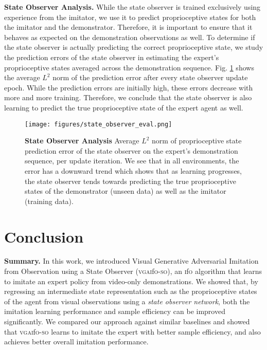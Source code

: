 \documentclass[letterpaper, 10 pt, conference]{ieeeconf}  %
\newcommand{\ifo}{\textsc{i}f\textsc{o}}
\newcommand{\vgaifoso}{\textsc{vgai}f\textsc{o}-\textsc{so}}
\begin{document}
\textbf{State Observer Analysis.} While the state observer is trained exclusively using experience from the imitator, we use it to predict proprioceptive states for both the imitator and the demonstrator. Therefore, it is important to ensure that it behaves as expected on the demonstration observations as well. To determine if the state observer is actually predicting the correct proprioceptive state, we study the prediction errors of the state observer in estimating the expert's proprioceptive states averaged across the demonstration sequence. Fig. \ref{fig:so_learning_curve} shows the average $L^2$ norm of the prediction error after every state observer update epoch. While the prediction errors are initially high, these errors decrease with more and more training. Therefore, we conclude that the state observer is also learning to predict the true proprioceptive state of the expert agent as well.

\begin{figure}
	\centering
	\texttt{[image: figures/state\_observer\_eval.png]}
	\caption{\textbf{State Observer Analysis} Average $L^2$ norm of proprioceptive state prediction error of the state observer on the expert's demonstration sequence, per update iteration. We see that in all environments, the error has a downward trend which shows that as learning progresses, the state observer tends towards predicting the true proprioceptive states of the demonstrator (unseen data) as well as the imitator (training data). }
	\label{fig:so_learning_curve}
\end{figure}


\section{Conclusion}
\label{sec:conclusion}
\textbf{Summary.} 
In this work, we introduced Visual Generative Adversarial Imitation from Observation using a State Observer (\vgaifoso{}), an \ifo{} algorithm that learns to imitate an expert policy from video-only demonstrations. We showed that, by regressing an intermediate state representation such as the proprioceptive states of the agent from visual observations using a \textit{state observer network}, both the imitation learning performance and sample efficiency can be improved significantly. We compared our approach against similar baselines and showed that \vgaifoso{} learns to imitate the expert with better sample efficiency, and also achieves better overall imitation performance.
\end{document}
